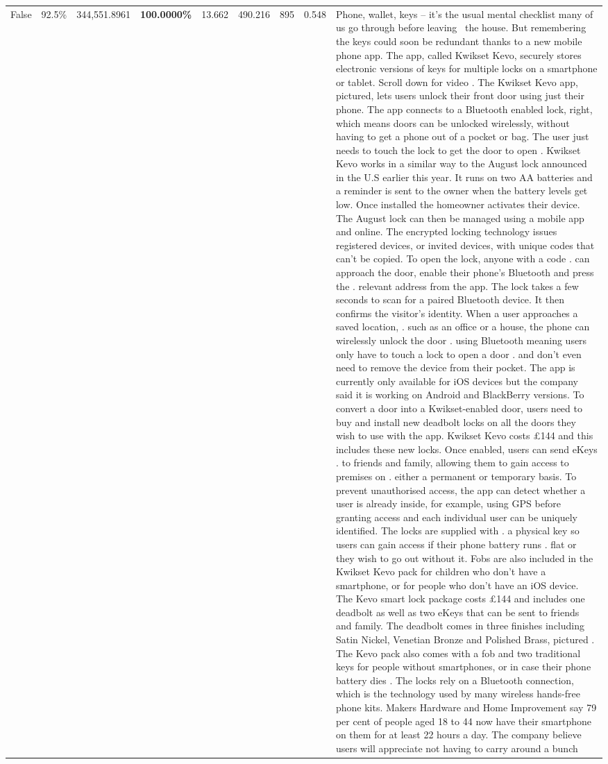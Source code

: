 \begin{table}[H]
\begin{tabular}{lllrlllll}
False & 92.5\% & 344,551.8961 & \bfseries \color{red} 100.0000\% & 13.662 & 490.216 & 895 & 0.548 & Phone, wallet, keys – it’s the usual mental checklist many of us go through before leaving  the house. But remembering the keys could soon be redundant thanks to a new mobile phone app. The app, called Kwikset Kevo, securely stores electronic versions of keys for multiple locks on a smartphone or tablet. Scroll down for video . The Kwikset Kevo app, pictured, lets users unlock their front door using just their phone. The app connects to a Bluetooth enabled lock, right, which means doors can be unlocked wirelessly, without having to get a phone out of a pocket or bag. The user just needs to touch the lock to get the door to open . Kwikset Kevo works in a similar way to the August lock announced in the U.S earlier this year. It runs on two AA batteries and a reminder is sent to the owner when the battery levels get low. Once installed the homeowner activates their device. The August lock can then be managed using a mobile app and online. The encrypted locking technology issues registered devices, or invited devices, with unique codes that can't be copied. To open the lock, anyone with a code . can approach the door, enable their phone's Bluetooth and press the . relevant address from the app. The lock takes a few seconds to scan for a paired Bluetooth device. It then confirms the visitor's identity. When a user approaches a saved location, . such as an office or a house, the phone can wirelessly unlock the door . using Bluetooth meaning users only have to touch a lock to open a door . and don't even need to remove the device from their pocket. The app is currently only available for iOS devices but the company said it is working on Android and BlackBerry versions. To convert a door into a Kwikset-enabled door, users need to buy and install new deadbolt locks on all the doors they wish to use with the app. Kwikset Kevo costs £144 and this includes these new locks. Once enabled, users can send eKeys . to friends and family, allowing them to gain access to premises on . either a permanent or temporary basis. To prevent unauthorised access, the app can detect whether a user is already inside, for example, using GPS before granting access and each individual user can be uniquely identified. The locks are supplied with . a physical key so users can gain access if their phone battery runs . flat or they wish to go out without it. Fobs are also included in the Kwikset Kevo pack for children who don't have a smartphone, or for people who don't have an iOS device. The Kevo smart lock package costs £144 and includes one deadbolt as well as two eKeys that can be sent to friends and family. The deadbolt comes in three finishes including Satin Nickel, Venetian Bronze and Polished Brass, pictured . The Kevo pack also comes with a fob and two traditional keys for people without smartphones, or in case their phone battery dies . The locks rely on a Bluetooth connection, which is the technology used by many wireless hands-free phone kits. Makers Hardware and Home Improvement say 79 per cent of people aged 18 to 44 now have their smartphone on them for at least 22 hours a day. The company believe users will appreciate not having to carry around a bunch 
\end{tabular}
\end{table}
